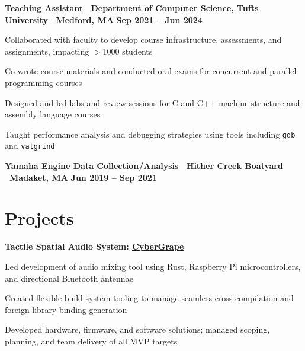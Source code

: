 \documentclass[10pt]{article}
\newenvironment{mylist}[1][]
{\itemize[nosep, wide=0pt, leftmargin=*, after=\strut]}
{\enditemize}
\begin{document}
\begin{minipage}[t]{\linewidth}
    \textbf{Teaching Assistant \textbar \ Department of Computer Science, Tufts University \textbar \ Medford, MA} \hfill \textbf{Sep 2021 -- Jun 2024}
    \begin{mylist} 
        \item Collaborated with faculty to develop course infrastructure, assessments, and assignments, impacting $>$1000 students
        \item Co-wrote course materials and conducted oral exams for concurrent and parallel programming courses
        \item Designed and led labs and review sessions for C and C++ machine structure and assembly language courses
        \item Taught performance analysis and debugging strategies using tools including \texttt{gdb} and \texttt{valgrind}
    \end{mylist}
\end{minipage}

\begin{minipage}[t]{\linewidth}
    \textbf{Yamaha Engine Data Collection/Analysis \textbar \ Hither Creek Boatyard \textbar \ Madaket, MA} \hfill \textbf{Jun 2019 -- Sep 2021}
\end{minipage}


\section{Projects}

\begin{minipage}[t]{\linewidth}
    \textbf{Tactile Spatial Audio System: \href{https://sgilfeather.github.io/CyberGrape/cybergrape/index.html}{CyberGrape}}
    \begin{mylist}
        \item Led development of audio mixing tool using Rust, Raspberry Pi microcontrollers, and directional Bluetooth antennae
        \item Created flexible build system tooling to manage seamless cross-compilation and foreign library binding generation
        \item Developed hardware, firmware, and software solutions; managed scoping, planning, and team delivery of all MVP targets
    \end{mylist}
\end{minipage}
\end{document}
